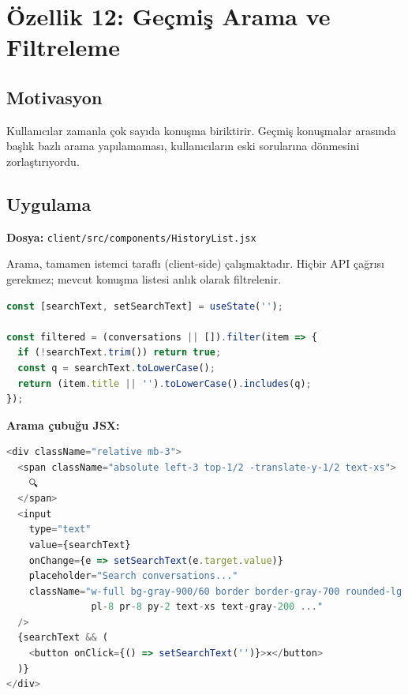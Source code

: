 \documentclass[12pt,a4paper]{article}
\begin{document}
\newpage

\section{Özellik 12: Geçmiş Arama ve Filtreleme}

\subsection{Motivasyon}
Kullanıcılar zamanla çok sayıda konuşma biriktirir. Geçmiş konuşmalar arasında başlık bazlı arama yapılamaması, kullanıcıların eski sorularına dönmesini zorlaştırıyordu.

\subsection{Uygulama}

\textbf{Dosya:} \texttt{client/src/components/HistoryList.jsx}

Arama, tamamen istemci taraflı (client-side) çalışmaktadır. Hiçbir API çağrısı gerekmez; mevcut konuşma listesi anlık olarak filtrelenir.

\begin{lstlisting}[language=JavaScript, caption={Client-side filtreleme mantığı}]
const [searchText, setSearchText] = useState('');

const filtered = (conversations || []).filter(item => {
  if (!searchText.trim()) return true;
  const q = searchText.toLowerCase();
  return (item.title || '').toLowerCase().includes(q);
});
\end{lstlisting}

\textbf{Arama çubuğu JSX:}

\begin{lstlisting}[language=JavaScript, caption={Arama input bileşeni}]
<div className="relative mb-3">
  <span className="absolute left-3 top-1/2 -translate-y-1/2 text-xs">
    🔍
  </span>
  <input
    type="text"
    value={searchText}
    onChange={e => setSearchText(e.target.value)}
    placeholder="Search conversations..."
    className="w-full bg-gray-900/60 border border-gray-700 rounded-lg
               pl-8 pr-8 py-2 text-xs text-gray-200 ..."
  />
  {searchText && (
    <button onClick={() => setSearchText('')}>✕</button>
  )}
</div>
\end{lstlisting}
\end{document}
